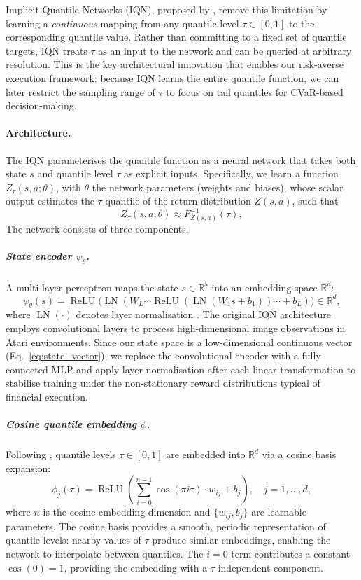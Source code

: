 \documentclass[11pt]{article}
\begin{document}
Implicit Quantile Networks (IQN), proposed by \citet{dabney2018implicit}, remove this limitation by learning a \emph{continuous} mapping from any quantile level $\tau \in [0,1]$ to the corresponding quantile value. Rather than committing to a fixed set of quantile targets, IQN treats $\tau$ as an input to the network and can be queried at arbitrary resolution. This is the key architectural innovation that enables our risk-averse execution framework: because IQN learns the entire quantile function, we can later restrict the sampling range of $\tau$ to focus on tail quantiles for CVaR-based decision-making.
 
\paragraph{Architecture.}
The IQN parameterises the quantile function as a neural network that takes both state $s$ and quantile level $\tau$ as explicit inputs. Specifically, we learn a function $Z_\tau(s,a;\theta)$, with $\theta$ the network parameters (weights and biases), whose scalar output estimates the $\tau$-quantile of the return distribution $Z(s,a)$, such that
\begin{equation}\label{eq:iqn_approx}
    Z_\tau(s,a;\theta) \approx F_{Z(s,a)}^{-1}(\tau),
\end{equation}
The network consists of three components.
 
\subparagraph{State encoder $\psi_\theta$.} A multi-layer perceptron maps the state $s \in \mathbb{R}^5$ into an embedding space $\mathbb{R}^d$:
\begin{equation}\label{eq:state_encoder}
    \psi_\theta(s) = \operatorname{ReLU}\bigl(\operatorname{LN}(W_L \cdots \operatorname{ReLU}(\operatorname{LN}(W_1 s + b_1))\cdots + b_L)\bigr) \in \mathbb{R}^d,
\end{equation}
where $\operatorname{LN}(\cdot)$ denotes layer normalisation \citet{ba2016layer}. The original IQN architecture \citet{dabney2018implicit} employs convolutional layers to process high-dimensional image observations in Atari environments. Since our state space is a low-dimensional continuous vector (Eq.~\ref{eq:state_vector}), we replace the convolutional encoder with a fully connected MLP and apply layer normalisation after each linear transformation to stabilise training under the non-stationary reward distributions typical of financial execution.
 
\subparagraph{Cosine quantile embedding $\phi$.} Following \citet{dabney2018implicit}, quantile levels $\tau \in [0,1]$ are embedded into $\mathbb{R}^d$ via a cosine basis expansion:
\begin{equation}\label{eq:cosine_embed}
    \phi_j(\tau) = \operatorname{ReLU}\!\left(\sum_{i=0}^{n-1} \cos(\pi i \tau) \cdot w_{ij} + b_j\right), \quad j = 1, \ldots, d,
\end{equation}
where $n$ is the cosine embedding dimension and $\{w_{ij}, b_j\}$ are learnable parameters. The cosine basis provides a smooth, periodic representation of quantile levels: nearby values of $\tau$ produce similar embeddings, enabling the network to interpolate between quantiles. The $i=0$ term contributes a constant $\cos(0) = 1$, providing the embedding with a $\tau$-independent component.
 
\end{document}

